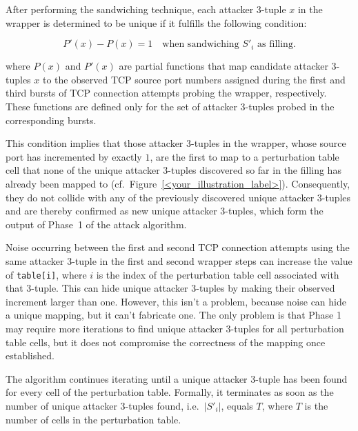 \documentclass[twocolumn]{report}
\begin{document}
After performing the sandwiching technique, each attacker 3-tuple \( x \) in the wrapper is determined to be \alert{unique} if it fulfills the following \alert{condition}:

\vspace{-0.2cm}
\begin{minipage}{\columnwidth}
\begin{equation*}
	P'(x) - P(x) = 1 
  	\quad \text{when sandwiching } S'_i \text{ as filling.}
\end{equation*}
\end{minipage}

where \(P(x)\) and \(P'(x)\) are partial functions that map \alert{candidate attacker 3-tuples \( x \) to} the observed \alert{TCP source port} numbers assigned during the first and third bursts of TCP connection attempts probing the wrapper, respectively. These functions are defined only for the set of attacker 3-tuples probed in the corresponding bursts.

This \alert{condition implies} that those attacker 3-tuples in the wrapper, whose source port has incremented by exactly $1$, are the first to map to a perturbation table cell that none of the unique attacker 3-tuples discovered so far in the filling has already been mapped to (cf.\ Figure~\ref{<your_illustration_label>}). Consequently, they do not collide with any of the previously discovered unique attacker 3-tuples and are thereby confirmed as new \alert{unique attacker 3-tuples}, which form the \alert{output} of Phase~1 of the attack algorithm.

\alert{Noise} occurring between the first and second TCP connection attempts using the same attacker 3-tuple in the first and second wrapper steps can increase the value of \texttt{table[i]}, where $i$ is the index of the perturbation table cell associated with that 3-tuple. This \alert{can hide} unique attacker 3-tuples by making their observed increment larger than one. However, this isn’t a problem, because noise can hide a unique mapping, but it \alert{can’t fabricate} one. The only problem is that Phase 1 may require more iterations to find unique attacker 3-tuples for all perturbation table cells, but it does not compromise the correctness of the mapping once established.

The algorithm continues iterating until a unique attacker 3-tuple has been found for every cell of the perturbation table. Formally, it \alert{terminates} as soon as the number of unique attacker 3-tuples found, i.e.\ $\lvert S'_i \rvert$, equals $T$, where $T$ is the number of cells in the perturbation table.
\end{document}
